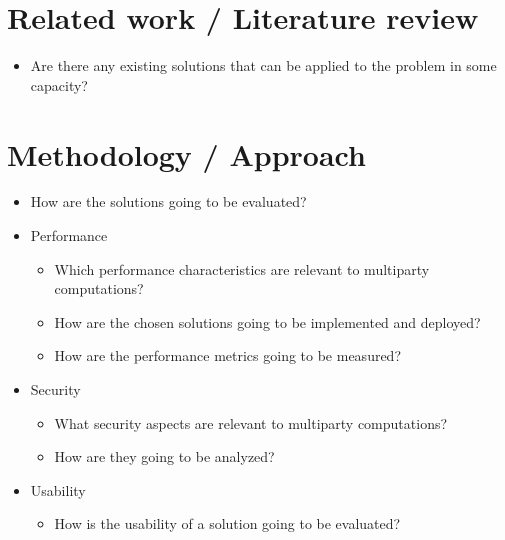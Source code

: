 \hypertarget{notes__06000-thesis.md__related-work-literature-review}{%
\section{Related work / Literature
review}\label{notes__06000-thesis.md__related-work-literature-review}}

\begin{itemize}
\tightlist
\item
  Are there any existing solutions that can be applied to the problem in
  some capacity?
\end{itemize}

\hypertarget{notes__06000-thesis.md__methodology-approach}{%
\section{Methodology /
Approach}\label{notes__06000-thesis.md__methodology-approach}}

\begin{itemize}
\tightlist
\item
  How are the solutions going to be evaluated?
\item
  Performance

  \begin{itemize}
  \tightlist
  \item
    Which performance characteristics are relevant to multiparty
    computations?
  \item
    How are the chosen solutions going to be implemented and deployed?
  \item
    How are the performance metrics going to be measured?
  \end{itemize}
\item
  Security

  \begin{itemize}
  \tightlist
  \item
    What security aspects are relevant to multiparty computations?
  \item
    How are they going to be analyzed?
  \end{itemize}
\item
  Usability

  \begin{itemize}
  \tightlist
  \item
    How is the usability of a solution going to be evaluated?
  \end{itemize}
\end{itemize}

